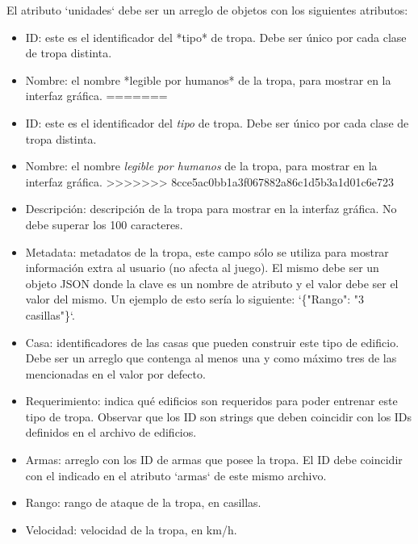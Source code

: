 \documentclass[titlepage,a4paper,12pt]{article}
\begin{document}
\begin{itemize}
\begin{itemize}
\end{itemize}

El atributo `unidades` debe ser un arreglo de objetos con los siguientes atributos:  

\begin{itemize}

<<<<<<< HEAD
\item ID: este es el identificador del *tipo* de tropa. Debe ser único por cada clase de tropa distinta.

\item Nombre: el nombre *legible por humanos* de la tropa, para mostrar en la interfaz gráfica.
=======
\item ID: este es el identificador del \textit{tipo} de tropa. Debe ser único por cada clase de tropa distinta.

\item Nombre: el nombre \textit{legible por humanos} de la tropa, para mostrar en la interfaz gráfica.
>>>>>>> 8cce5ac0bb1a3f067882a86c1d5b3a1d01c6e723

\item Descripción: descripción de la tropa para mostrar en la interfaz gráfica. No debe superar los 100 caracteres.

\item Metadata: metadatos de la tropa, este campo sólo se utiliza para mostrar información extra al usuario (no afecta al juego). El mismo debe ser un objeto JSON donde la clave es un nombre de atributo y el valor debe ser el valor del mismo. Un ejemplo de esto sería lo siguiente: `\{"Rango": "3 casillas"\}`.

\item Casa: identificadores de las casas que pueden construir este tipo de edificio. Debe ser un arreglo que contenga al menos una y como máximo tres de las mencionadas en el valor por defecto. 

\item Requerimiento: indica qué edificios son requeridos para poder entrenar este tipo de tropa. Observar que los ID son strings que deben coincidir con los IDs definidos en el archivo de edificios.

\item Armas: arreglo con los ID de armas que posee la tropa. El ID debe coincidir con el indicado en el atributo `armas` de este mismo archivo.

\item Rango: rango de ataque de la tropa, en casillas.

\item Velocidad: velocidad de la tropa, en km/h.


\end{itemize}
\end{itemize}
\end{document}
